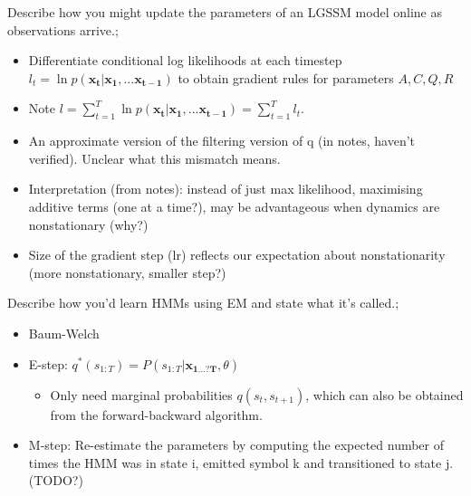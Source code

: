 \documentclass{article}
\begin{document}
Describe how you might update the parameters of an LGSSM model online as observations arrive.; \begin{itemize} \item Differentiate conditional log likelihoods at each timestep $l_t=\ln p(\mathbf{x_t|x_1,...x_{t-1}})$ to obtain gradient rules for parameters $A, C, Q, R$ \item Note $l=\sum_{t=1}^T\ln  p(\mathbf{x_t|x_1,...x_{t-1}})=\sum_{t=1}^Tl_t$. \item An approximate version of the filtering version of q (in notes, haven't verified). Unclear what this mismatch means. \item Interpretation (from notes): instead of just max likelihood, maximising additive terms (one at a time?), may be advantageous when dynamics are nonstationary (why?) \item Size of the gradient step (lr) reflects our expectation about nonstationarity (more nonstationary, smaller step?) \end{itemize}

Describe how you'd learn HMMs using EM and state what it's called.; \begin{itemize} \item Baum-Welch \item E-step: $q^*(s_{1:T})=P(s_{1:T}|\mathbf{x_{1...?T}}, \theta)$ \begin{itemize} \item Only need marginal probabilities $q(s_t, s_{t+1})$, which can also be obtained from the forward-backward algorithm. \end{itemize} \item M-step: Re-estimate the parameters by computing the expected number of times the HMM was in state i, emitted symbol k and transitioned to state j. (TODO?) \end{itemize}
\end{document}

